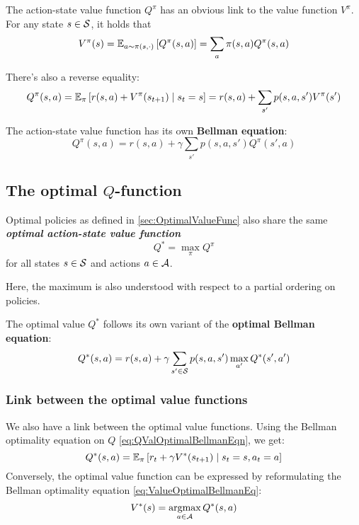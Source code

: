 \documentclass[../course-notes.tex]{subfiles}
\begin{document}
The action-state value function $Q^\pi$ has an obvious link to the value function $V^\pi$.
For any state $s\in\mathcal{S}$, it holds that
\begin{equation}\label{eq:ValueFunctionExpectationLink}
	V^\pi(s) = \operatorname{\mathbb{E}}_{a\sim \pi(s,\cdot)}\left[
	Q^\pi(s, a)
	\right]
	= \sum_a \pi(s,a) Q^\pi(s,a)
\end{equation}

There's also a reverse equality:
\begin{equation}
	Q^\pi(s,a) =
	\operatorname{\mathbb{E}}_{\pi}\left[
		r(s,a) + V^\pi(s_{t+1})
		\;\middle|\; s_t = s
	\right]
	=
	r(s, a) + \sum_{s'} p(s,a,s') V^\pi(s')
\end{equation}

The action-state value function has its own \textbf{\bluefont Bellman equation}:
\begin{equation}
	Q^\pi(s,a) = r(s,a) + \gamma
	\sum_{s'} p(s,a,s') Q^\pi(s',a)
\end{equation}


\subsection{The optimal $Q$-function}

\begin{defn}
	Optimal policies as defined in \cref{sec:OptimalValueFunc} also share the same \emph{\bfseries\bluefont optimal action-state value function}
	\begin{equation}
		Q^* = \max_\pi Q^\pi
	\end{equation}
	for all states $s\in\mathcal{S}$ and actions $a\in\mathcal{A}$.	
\end{defn}

Here, the maximum is also understood with respect to a partial ordering on policies.

The optimal value $Q^*$ follows its own variant of the \textbf{\bluefont optimal Bellman equation}:
\begin{equation}\label{eq:QValOptimalBellmanEqn}
	Q^*(s,a) = r(s,a) + 
	\gamma\sum_{s'\in\mathcal{S}} p(s,a,s') \max_{a'} Q^*(s',a')
\end{equation}


\subsubsection{Link between the optimal value functions}

We also have a link between the optimal value functions. Using the Bellman optimality equation on $Q$ \eqref{eq:QValOptimalBellmanEqn}, we get:
\[
	Q^*(s,a) = \operatorname{\mathbb{E}}_\pi\left[
	r_t + \gamma V^*(s_{t+1}) \;\middle|\; s_t=s, a_t=a
	\right]
\]
Conversely, the optimal value function can be expressed by reformulating the Bellman optimality equation \eqref{eq:ValueOptimalBellmanEq}:
\begin{equation}
	V^*(s) =
	\operatorname*{\mathrm{argmax}}_{a\in\mathcal{A}} Q^*(s,a)
\end{equation}
\end{document}
